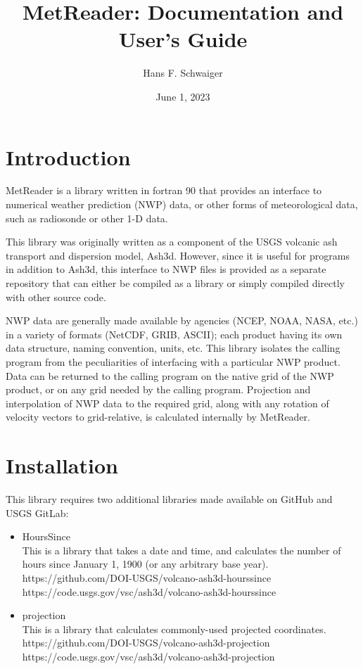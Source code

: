 \documentclass[11pt]{article}   %
\begin{document}
\title{MetReader: Documentation and User's Guide}   %
\author{Hans F. Schwaiger}
\date{June 1, 2023}    %
\maketitle

\section{Introduction}
MetReader is a library written in fortran 90 that provides an interface to
numerical weather prediction (NWP) data, or other forms of meteorological
data, such as radiosonde or other 1-D data.

This library was originally written as a component of the USGS volcanic ash
transport and dispersion model, Ash3d.  However, since it is useful for
programs in addition to Ash3d, this interface to NWP files is provided
as a separate repository that can either be compiled as a library or simply
compiled directly with other source code.

NWP data are generally made available by agencies (NCEP, NOAA, NASA, etc.)
in a variety of formats (NetCDF, GRIB, ASCII); each product having
its own data structure, naming convention, units, etc.  This library
isolates the calling program from the peculiarities of interfacing with
a particular NWP product.  Data can be returned to the calling program on
the native grid of the NWP product, or on any grid needed by the calling
program.  Projection and interpolation of NWP data to the required grid, along
with any rotation of velocity vectors to grid-relative, is calculated internally by
MetReader.

\section{Installation}
This library requires two additional libraries made available on GitHub and USGS GitLab:
\begin{itemize}
\item HoursSince \\
This is a library that takes a date and time, and calculates the number of hours
since January 1, 1900 (or any arbitrary base year).\\
https://github.com/DOI-USGS/volcano-ash3d-hourssince\\
https://code.usgs.gov/vsc/ash3d/volcano-ash3d-hourssince
\item projection \\
This is a library that calculates commonly-used projected coordinates.\\
https://github.com/DOI-USGS/volcano-ash3d-projection\\
https://code.usgs.gov/vsc/ash3d/volcano-ash3d-projection
\end{itemize}
\end{document}
